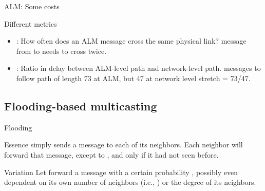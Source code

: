 \begin{slide}{ALM: Some costs}
  \begin{block}{Different metrics}
    \begin{center}
    \end{center}
    \begin{itemize}\tightlist
    \item {}: How often does an ALM message cross the same physical link? 
      message from  to  needs to cross  twice.
    \item {}: Ratio in delay between ALM-level path and network-level path. 
      messages  to  follow path of length 73 at ALM, but 47 at network level
      \mathexpr{\Rightarrow} stretch = 73/47.
    \end{itemize}
  \end{block}
\end{slide}
\subsection{Flooding-based multicasting}
\begin{slide}{Flooding}
  \begin{block}{Essence}
     simply sends a message  to each of its neighbors. Each neighbor will forward that
    message, except to , and only if it had not seen  before.
  \end{block}
  \begin{centerfig}
  \end{centerfig}
  \onslide
  \begin{block}{Variation}
    Let  forward a message with a certain probability , possibly even dependent
    on its own number of neighbors (i.e., ) or the degree of its neighbors.
  \end{block}
\end{slide}
